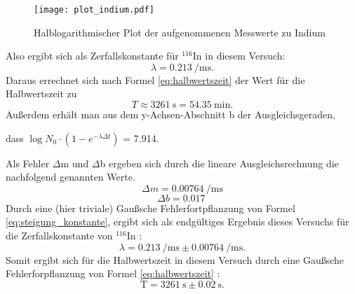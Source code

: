 %
\begin{figure}
\centering
\texttt{[image: plot\_indium.pdf]}
\caption{Halblogarithmischer Plot der aufgenommenen Messwerte zu Indium}
\label{fig:plot_indium}
\end{figure}
%
Also ergibt sich als Zerfallskonstante für  ${}^{116}$In in diesem Versuch:
%
\begin{equation*}
\lambda = \SI{0.213}{\per\milli\second}.
\end{equation*}
%
Daraus errechnet sich nach Formel \eqref{eq:halbwertszeit} der Wert für die Halbwertszeit zu 
%
\begin{equation*}
T \approx \SI{3261}{\second} = \SI{54.35}{\minute}.
\end{equation*}
%
Außerdem erhält man aus dem y-Achsen-Abschnitt b der Ausgleichsgeraden,

\begin{centering}
dass $\log{N_0 \cdot (1- e^{-\lambda \Delta t})}$ = \SI{7.914}{}.
\end{centering}


Als Fehler $\Delta$m und $\Delta$b ergeben sich durch die lineare Ausgleichsrechnung die nachfolgend genannten Werte.
%
\begin{equation*}
\Delta m = \SI{0.00764}{\per\milli\second}
\end{equation*}
%
\begin{equation*}
\Delta b = \SI{0.017}{}
\end{equation*}
%
Durch eine (hier triviale) Gau\ss sche Fehlerfortpflanzung von Formel \eqref{eq:steigung_konstante}, ergibt sich als endgültiges Ergebnis dieses Versuchs für die Zerfallskonstante von ${}^{116}$In :
%
\begin{equation*}
\lambda = \SI{0.213}{\per\milli\second} \pm \SI{0.00764}{\per\milli\second}.
\end{equation*}
%
Somit ergibt sich für die Halbwertszeit in diesem Versuch durch eine Gau\ss sche Fehlerforpflanzung von Formel \eqref{eq:halbwertszeit} : 
%
\begin{equation*}
\text{T} = \SI{3261}{\second} \pm \SI{0.02}{\second}.
\end{equation*}
%
